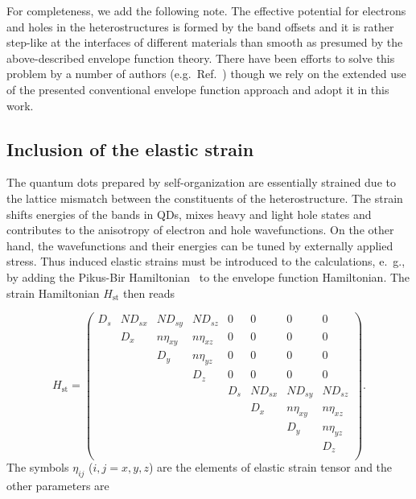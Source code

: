For completeness, we add the following note. The effective potential for electrons and holes in the heterostructures is formed by the band offsets and it is rather step-like at the interfaces of different materials than smooth as presumed by the above-described envelope function theory. There have been efforts to solve this problem by a number of authors (e.g.~Ref.~\citep{MlinarEnvelope}) though we rely on the extended use of the presented conventional envelope function approach and adopt it in this work. 

\subsection{Inclusion of the elastic strain}

The quantum dots prepared by self-organization are essentially strained due to the lattice mismatch between the constituents of the heterostructure. The strain shifts energies of the bands in QDs, mixes heavy and light hole states and contributes to the anisotropy of electron and hole wavefunctions. On the other hand, the wavefunctions and their energies can be tuned by externally applied stress. Thus induced elastic strains must be introduced to the calculations, e.~g., by adding the Pikus-Bir Hamiltonian~\citep{BirPik} to the envelope function Hamiltonian. The strain Hamiltonian $H_\mathrm{st}$ then reads

\begin{equation}
H_\mathrm{st}=
\begin{pmatrix}
D_s& ND_{sx}& ND_{sy}& ND_{sz}& 0& 0& 0& 0\\
& D_x& n\eta_{xy}& n\eta_{xz}& 0& 0& 0& 0\\
& & D_y& n\eta_{yz}& 0& 0& 0& 0\\
& & & D_z& 0& 0& 0& 0\\
& & & & D_s& ND_{sx}& ND_{sy}& ND_{sz}\\
& & & & & D_x& n\eta_{xy}& n\eta_{xz}\\
& & & & & & D_y& n\eta_{yz}\\
& & & & & & & D_z\\\end{pmatrix}.
\end{equation}
The symbols $\eta_{ij}$ ($i,j=x,y,z$) are the elements of elastic strain tensor and the other parameters are

